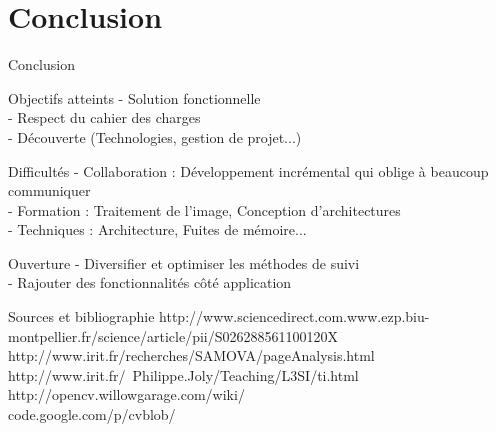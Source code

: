 \documentclass{beamer}
\begin{document}
	\section{Conclusion}
		\begin{frame}{Conclusion}
			\begin{exampleblock}{Objectifs atteints}
				- Solution fonctionnelle \\
				- Respect du cahier des charges \\
				- Découverte (Technologies, gestion de projet...) \\ 
			\end{exampleblock}
			\pause
			\begin{alertblock}{Difficultés}
				- Collaboration : Développement incrémental qui oblige à beaucoup communiquer \\
				- Formation : Traitement de l'image, Conception d'architectures \\
				- Techniques : Architecture, Fuites de mémoire...\\
			\end{alertblock}
			\pause
			\begin{block}{Ouverture}
				- Diversifier et optimiser les méthodes de suivi \\
				- Rajouter des fonctionnalités côté application \\
			\end{block}
		\end{frame}
	
	\begin{frame}{Sources et bibliographie}
  http://www.sciencedirect.com.www.ezp.biu-montpellier.fr/science/article/pii/S026288561100120X \\
  http://www.irit.fr/recherches/SAMOVA/pageAnalysis.html\\
  http://www.irit.fr/~Philippe.Joly/Teaching/L3SI/ti.html\\
  http://opencv.willowgarage.com/wiki/\\
  code.google.com/p/cvblob/ 
	\end{frame}
\end{document}

